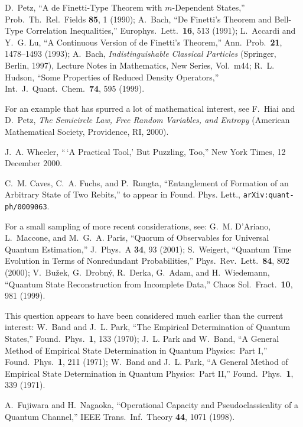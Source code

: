 \documentclass[12pt,aps,eqsecnum]{revtex4-1}
\begin{document}
\begin{thebibliography}{10}
D.~Petz, ``A de Finetti-Type Theorem with $m$-Dependent States,''
Prob.\ Th.\ Rel.\ Fields {\bf 85}, 1 (1990); A.~Bach, ``De Finetti's
Theorem and Bell-Type Correlation Inequalities,'' Europhys.\ Lett.\
{\bf 16}, 513 (1991); L.~Accardi and Y.~G. Lu, ``A Continuous Version
of de Finetti's Theorem,'' Ann.\ Prob.\ {\bf 21}, 1478--1493 (1993);
A.~Bach, {\sl Indistinguishable Classical Particles\/} (Springer,
Berlin, 1997), Lecture Notes in Mathematics, New Series, Vol.\ m44;
R.~L. Hudson, ``Some Properties of Reduced Density Operators,'' Int.\
J.\ Quant.\ Chem.\ {\bf 74}, 595 (1999).

For an example that has spurred a lot of mathematical interest, see
F.~Hiai and D.~Petz, {\sl The Semicircle Law, Free Random Variables,
and Entropy\/} (American Mathematical Society, Providence, RI, 2000).

\bibitem{Wheeler2000}
J.~A. Wheeler, ``\,`A Practical Tool,' But Puzzling, Too,'' New York
Times, 12 December 2000.

C.~M. Caves, C.~A. Fuchs, and P.~Rungta, ``Entanglement of Formation
of an Arbitrary State of Two Rebits,'' to appear in Found. Phys. Lett.,
{\tt arXiv:quant-ph/0009063}.

For a small sampling of more recent considerations, see: G.~M.
D'Ariano, L.~Maccone, and M.~G.~A. Paris, ``Quorum of Observables for
Universal Quantum Estimation,'' J.\ Phys.\ A {\bf 34}, 93 (2001);
S.~Weigert, ``Quantum Time Evolution in Terms of Nonredundant
Probabilities,'' Phys.\ Rev.\ Lett.\ {\bf 84}, 802 (2000);
V.~Bu\v{z}ek, G.~Drobn\'y, R.~Derka, G.~Adam, and H.~Wiedemann,
``Quantum State Reconstruction from Incomplete Data,'' Chaos Sol.\
Fract.\ {\bf 10}, 981 (1999).

\bibitem{QuorumOld}
This question appears to have been considered much earlier than
the current interest: W.~Band and J.~L. Park, ``The Empirical
Determination of Quantum States,'' Found.\ Phys.\ {\bf 1}, 133
(1970); J.~L. Park and W.~Band, ``A General Method of Empirical
State Determination in Quantum Physics:\ Part I,'' Found.\ Phys.\
{\bf 1}, 211 (1971); W.~Band and J.~L. Park, ``A General Method of
Empirical State Determination in Quantum Physics:\ Part II,''
Found.\ Phys.\ {\bf 1}, 339 (1971).

\bibitem{Fujiwara1998}
A.~Fujiwara and H.~Nagaoka, ``Operational Capacity and
Pseudoclassicality of a Quantum Channel,'' IEEE Trans.\ Inf.\
Theory {\bf 44}, 1071 (1998).


\end{thebibliography}
\end{document}
